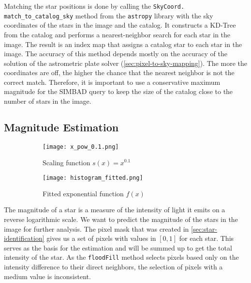 Matching the star positions is done by calling the \texttt{SkyCoord.\allowbreak
  match\_to\_catalog\_sky} method from the \texttt{astropy} library \cite{astropy2022} with
the sky coordinates of the stars in the image and the catalog. It constructs a KD-Tree
from the catalog and performs a nearest-neighbor search for each star in the image. The
result is an index map that assigns a catalog star to each star in the image. The accuracy
of this method depends mostly on the accuracy of the solution of the astrometric plate
solver (\autoref{sec:pixel-to-sky-mapping}). The more the coordinates are off, the higher
the chance that the nearest neighbor is not the correct match. Therefore, it is important
to use a conservative maximum magnitude for the SIMBAD query to keep the size of the
catalog close to the number of stars in the image.

\subsection{Magnitude Estimation}
\label{sec:magnitude-estimation}

\begin{figure}[tb]
  \centering
  \begin{subfigure}{.49\textwidth}
    \centering
    \texttt{[image: x\_pow\_0.1.png]}
    \caption{Scaling function $s(x) = x^{0.1}$}
    \label{fig:kmeans-scaling}
  \end{subfigure}%
  \hfill
  \begin{subfigure}{.49\textwidth}
    \centering
    \texttt{[image: histogram\_fitted.png]}
    \caption{Fitted exponential function $f(x)$}
    \label{fig:fitted-exponential}
  \end{subfigure}
  \caption{}
\end{figure}

The magnitude of a star is a measure of the intensity of light it emits on a reverse
logarithmic scale. We want to predict the magnitude of the stars in the image for further
analysis. The pixel mask that was created in \autoref{sec:star-identification} gives us a
set of pixels with values in $[0, 1]$ for each star. This serves as the basis for the
estimation and will be summed up to get the total intensity of the star. As the
\texttt{floodFill} method selects pixels based only on the intensity difference to their
direct neighbors, the selection of pixels with a medium value is inconsistent.

